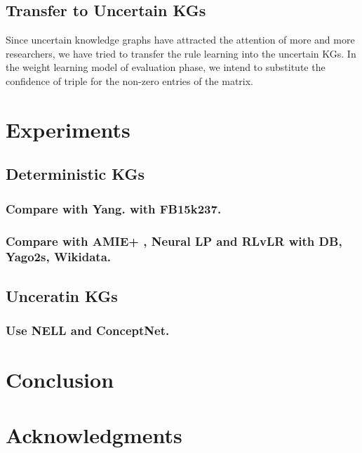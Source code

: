 \documentclass{article}
\begin{document}
	\subsection{Transfer to Uncertain KGs}
	Since uncertain knowledge graphs have attracted the attention of more and more researchers, we have tried to transfer the rule learning into the uncertain KGs. In the weight learning model of evaluation phase, we intend to substitute the confidence of triple for the non-zero entries of the matrix.


	\section{Experiments}
	\subsection{Deterministic KGs}
	\subsubsection{Compare with Yang. with FB15k237.}
	\subsubsection{Compare with AMIE+ , Neural LP and RLvLR with DB, Yago2s, Wikidata.}
	\subsection{Unceratin KGs}
	\subsubsection{Use NELL and ConceptNet.}
	
	
	\section{Conclusion}
	
	
	\section*{Acknowledgments}
	
	
	
	
	
\end{document}
